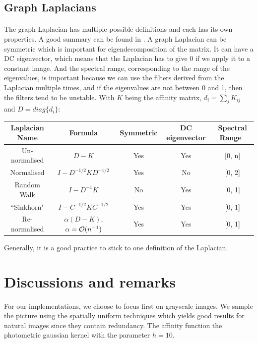 \subsection{Graph Laplacians}
\label{subsec:laplacian-variations}

\paragraph{}
The graph Laplacian has multiple possible definitions and each has its own properties.
A good summary can be found in \cite{siam_slides_2016}.
A graph Laplacian can be symmetric which is important for eigendecomposition of the matrix.
It can have a DC eigenvector, which means that the Laplacian has to give 0 if we apply it to a constant image.
And the spectral range, corresponding to the range of the eigenvalues, is important because we can use the filters derived from the Laplacian multiple times, and if the eigenvalues are not between 0 and 1, then the filters tend to be unstable.
With \(K\) being the affinity matrix, \(d_i = \sum_j K_{ij}\) and \(D = diag\{d_i\}\):

\begin{table}[!htbp]
 \centering
 \begin{tabular}{|c|c|c|c|c|}
  \hline
  Laplacian Name & Formula & Symmetric & DC eigenvector & Spectral Range \\
  \hline
  Un-normalised & \(D - K\) & Yes & Yes & [0, n] \\
  \hline
  Normalised & \(I - D^{-1/2}KD^{-1/2}\) & Yes & No & [0, 2] \\
  \hline
  Random Walk & \(I - D^{-1}K\) & No & Yes & [0, 1] \\
  \hline
  ``Sinkhorn" \cite{milanfar_symmetrizing_2013} & \(I - C^{-1/2}KC^{-1/2}\) & Yes & Yes & [0, 1] \\
  \hline
  Re-normalised \cite{milanfar_new_2016} & \(\alpha(D - K)\), \(\alpha = \operatorname{\mathcal{O}}(n^{-1})\) & Yes & Yes & [0, 1] \\
  \hline
 \end{tabular}
\end{table}

Generally, it is a good practice to stick to one definition of the Laplacian.

\section{Discussions and remarks}

\paragraph{}
For our implementations, we choose to focus first on grayscale images.
We sample the picture using the spatially uniform techniques which yields good results for natural images since they contain redundancy.
The affinity function the photometric gaussian kernel with the parameter \(h = 10\).


